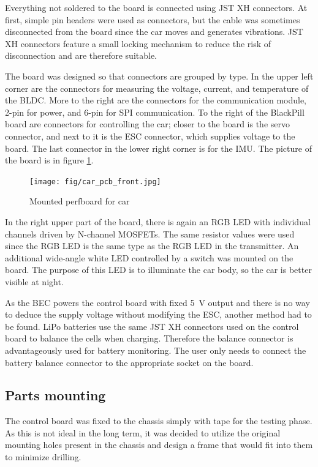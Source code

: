 Everything not soldered to the board is connected using JST XH connectors. At first, simple pin headers were used as connectors, but the cable was sometimes disconnected from the board since the car moves and generates vibrations. JST XH connectors feature a small locking mechanism to reduce the risk of disconnection and are therefore suitable.

The board was designed so that connectors are grouped by type. In the upper left corner are the connectors for measuring the voltage, current, and temperature of the BLDC. More to the right are the connectors for the communication module, 2-pin for power, and 6-pin for SPI communication. To the right of the BlackPill board are connectors for controlling the car; closer to the board is the servo connector, and next to it is the ESC connector, which supplies voltage to the board. The last connector in the lower right corner is for the IMU. The picture of the board is in figure \ref{fig:car_pcb}.
\begin{figure}[t]
\centering
\texttt{[image: fig/car\_pcb\_front.jpg]}
\caption{Mounted perfboard for car}
\label{fig:car_pcb}
\end{figure}

In the right upper part of the board, there is again an RGB LED with individual channels driven by N-channel MOSFETs. The same resistor values were used since the RGB LED is the same type as the RGB LED in the transmitter. An additional wide-angle white LED controlled by a switch was mounted on the board. The purpose of this LED is to illuminate the car body, so the car is better visible at night.

As the BEC powers the control board with fixed \SI{5}{\V} output and there is no way to deduce the supply voltage without modifying the ESC, another method had to be found. LiPo batteries use the same JST XH connectors used on the control board to balance the cells when charging. Therefore the balance connector is advantageously used for battery monitoring. The user only needs to connect the battery balance connector to the appropriate socket on the board.

\subsection{Parts mounting}
The control board was fixed to the chassis simply with tape for the testing phase. As this is not ideal in the long term, it was decided to utilize the original mounting holes present in the chassis and design a frame that would fit into them to minimize drilling.

